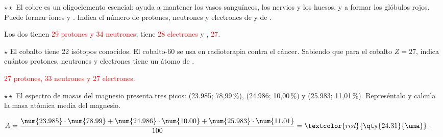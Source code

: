 \begin{exercise}
    \(\star\star\) El cobre es un oligoelemento esencial: ayuda a mantener los vasos sanguíneos, los nervios y los huesos, y a
    formar los glóbulos rojos. Puede formar iones  y . Indica el número de protones, neutrones y electrones de
     y de .
    \begin{solu}
        Los dos tienen \textcolor{red}{29 protones y 34 neutrones};  tiene \textcolor{red}{28 electrones} y ,
        \textcolor{red}{27}.
    \end{solu}
\end{exercise}

\begin{exercise}
    \(\star\) El cobalto tiene 22 isótopos conocidos. El cobalto-60 se usa en radioterapia contra el cáncer. Sabiendo que para el
    cobalto \(Z = 27\), indica cuántos protones, neutrones y electrones tiene un átomo de .
    \begin{solu}
        \textcolor{red}{27 protones, 33 neutrones y 27 electrones.}
    \end{solu}
\end{exercise}

\begin{exercise}
    \(\star\star\) El espectro de masas del magnesio presenta tres picos:  (\qty{23.985}{\uma}; 78,99\,\%),
     (\qty{24.986}{\uma}; 10,00\,\%) y  (\qty{25.983}{\uma}; 11,01\,\%). Represéntalo y calcula la masa
    atómica media del magnesio.
    \begin{center}
    \end{center}
    \begin{solu}
        \(\bar{A} = \dfrac{\num{23.985} \cdot \num{78.99} + \num{24.986} \cdot \num{10.00} + \num{25.983} \cdot \num{11.01}}{100} =
        \textcolor{red}{\qty{24.31}{\uma}}\).
    \end{solu}
\end{exercise}

